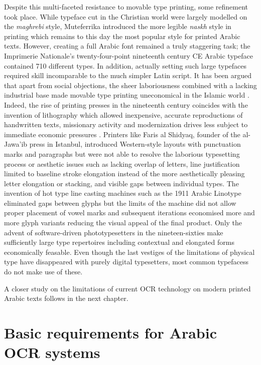 Despite this multi-faceted resistance to movable type printing, some refinement
took place. While typeface cut in the Christian world were largely modelled on
the \emph{maghrebi} style, Muteferrika introduced the more legible \emph{naskh}
style in printing which remains to this day the most popular style for printed
Arabic texts. However, creating a full Arabic font remained a truly staggering
task; the Imprimerie Nationale's twenty-four-point nineteenth century CE Arabic
typeface contained 710 different types\cite[pg. 218]{bloompaper}. In addition,
actually setting such large typefaces required skill incomparable to the much
simpler Latin script. It has been argued that apart from social objections, the
sheer laboriousness combined with a lacking industrial base made movable type
printing uneconomical in the Islamic world \cite{auji2017neither}. Indeed, the
rise of printing presses in the nineteenth century coincides with the invention
of lithography which allowed inexpensive, accurate reproductions of handwritten
texts, missionary activity and modernization drives less subject to immediate
economic pressures \cite{turner1996dictionary}. Printers like Faris al Shidyaq,
founder of the al-Jawa'ib press in Istanbul, introduced Western-style layouts
with punctuation marks and paragraphs but were not able to resolve the
laborious typesetting process or aesthetic issues such as lacking overlap of
letters, line justification limited to baseline stroke elongation instead of
the more aesthetically pleasing letter elongation or stacking, and visible gaps
between individual types\cite[pg. 605]{blair2006islamic}. The invention of hot
type line casting machines such as the 1911 Arabic Linotype eliminated gaps
between glyphs but the limits of the machine did not allow proper placement of
vowel marks \cite[pg. 67]{nemeth2017arabic} and subsequent iterations
economised more and more glyph variants reducing the visual appeal of the final
product. Only the advent of software-driven phototypesetters in the
nineteen-sixties make sufficiently large type repertoires including contextual
and elongated forms economically feasable. Even though the last vestiges of the
limitations of physical type have disappeared with purely digital typesetters,
most common typefacess do not make use of these.

A closer study on the limitations of current OCR technology on modern printed
Arabic texts follows in the next chapter.

\section{Basic requirements for Arabic OCR systems}


